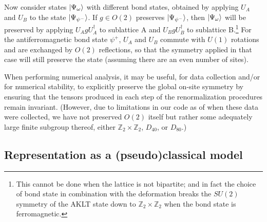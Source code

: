 \documentclass[aps,prb,letterpaper,superscriptaddress,twocolumn,showpacs,floatfix,10pt]{revtex4-1}
\begin{document}
Now consider states $\vert\Psi_\omega\rangle$ with different bond states,
obtained by applying $U_A$ and $U_B$ to the
state $\vert\Psi_{\psi^-}\rangle$. If $g \in O(2)$ preserves $\vert\Psi_{\psi^-}\rangle$,
then $\vert\Psi_\omega\rangle$ will be preserved by applying
$U_AgU_A^\dagger$ to sublattice A and $U_BgU_B^\dagger$ to sublattice
B.\footnote{This cannot be done when the lattice is not bipartite;
and in fact the choice of bond state in combination with the deformation
breaks the $SU(2)$ symmetry of the AKLT state down to $\mathbb{Z}_2\times
\mathbb{Z}_2$ when the bond state is ferromagnetic.}
For the antiferromagnetic bond state $\psi^+$, $U_A$ and $U_B$ commute with
$U(1)$ rotations and are exchanged by $O(2)$ reflections, so that the symmetry
applied in that case will still preserve the state (assuming there are an even
number of sites).

When performing numerical analysis, it may be useful, for data collection
and/or for numerical stability, to explicitly preserve the global on-site
symmetry\cite{Singh1,HeST} by ensuring that the tensors produced in each
step of the renormalization procedures remain invariant. (However, due to
limitations in our code as of when these data were collected, we have not
preserved $O(2)$ itself but rather some adequately large finite subgroup
thereof, either $\mathbb{Z}_2\times \mathbb{Z}_2$, $D_{40}$, or $D_{80}$.)

\subsection{Representation as a (pseudo)classical model}
\label{sec:pseudoclassical}
\end{document}
